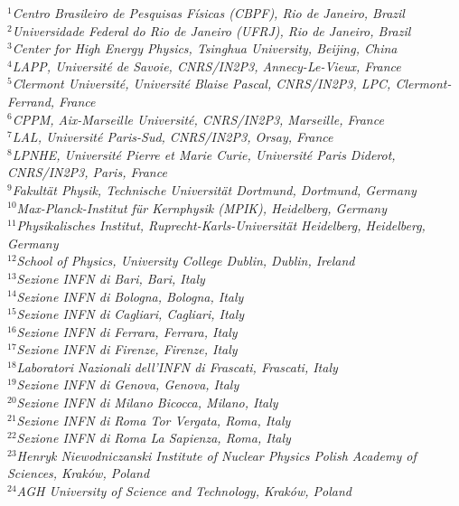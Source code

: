 \documentclass[12pt,a4paper]{article}
\begin{document}
\begin{titlepage}
\begin{center}
\begin{flushleft}
{\footnotesize \it
$ ^{1}$Centro Brasileiro de Pesquisas F\'{i}sicas (CBPF), Rio de Janeiro, Brazil\\
$ ^{2}$Universidade Federal do Rio de Janeiro (UFRJ), Rio de Janeiro, Brazil\\
$ ^{3}$Center for High Energy Physics, Tsinghua University, Beijing, China\\
$ ^{4}$LAPP, Universit\'{e} de Savoie, CNRS/IN2P3, Annecy-Le-Vieux, France\\
$ ^{5}$Clermont Universit\'{e}, Universit\'{e} Blaise Pascal, CNRS/IN2P3, LPC, Clermont-Ferrand, France\\
$ ^{6}$CPPM, Aix-Marseille Universit\'{e}, CNRS/IN2P3, Marseille, France\\
$ ^{7}$LAL, Universit\'{e} Paris-Sud, CNRS/IN2P3, Orsay, France\\
$ ^{8}$LPNHE, Universit\'{e} Pierre et Marie Curie, Universit\'{e} Paris Diderot, CNRS/IN2P3, Paris, France\\
$ ^{9}$Fakult\"{a}t Physik, Technische Universit\"{a}t Dortmund, Dortmund, Germany\\
$ ^{10}$Max-Planck-Institut f\"{u}r Kernphysik (MPIK), Heidelberg, Germany\\
$ ^{11}$Physikalisches Institut, Ruprecht-Karls-Universit\"{a}t Heidelberg, Heidelberg, Germany\\
$ ^{12}$School of Physics, University College Dublin, Dublin, Ireland\\
$ ^{13}$Sezione INFN di Bari, Bari, Italy\\
$ ^{14}$Sezione INFN di Bologna, Bologna, Italy\\
$ ^{15}$Sezione INFN di Cagliari, Cagliari, Italy\\
$ ^{16}$Sezione INFN di Ferrara, Ferrara, Italy\\
$ ^{17}$Sezione INFN di Firenze, Firenze, Italy\\
$ ^{18}$Laboratori Nazionali dell'INFN di Frascati, Frascati, Italy\\
$ ^{19}$Sezione INFN di Genova, Genova, Italy\\
$ ^{20}$Sezione INFN di Milano Bicocca, Milano, Italy\\
$ ^{21}$Sezione INFN di Roma Tor Vergata, Roma, Italy\\
$ ^{22}$Sezione INFN di Roma La Sapienza, Roma, Italy\\
$ ^{23}$Henryk Niewodniczanski Institute of Nuclear Physics  Polish Academy of Sciences, Krak\'{o}w, Poland\\
$ ^{24}$AGH University of Science and Technology, Krak\'{o}w, Poland\\
}
\end{flushleft}
\end{center}
\end{titlepage}
\end{document}
